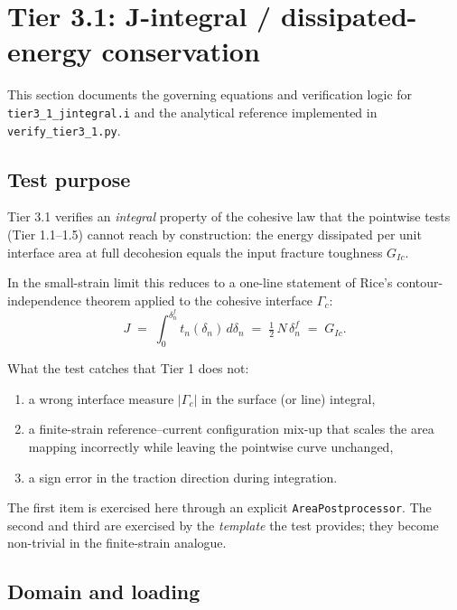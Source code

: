 \section{Tier 3.1: J-integral / dissipated-energy conservation}
\label{sec:tier3_1}

This section documents the governing equations and verification logic for
\texttt{tier3\_1\_jintegral.i} and the analytical reference implemented in
\texttt{verify\_tier3\_1.py}.

\subsection{Test purpose}

Tier 3.1 verifies an \emph{integral} property of the cohesive law that the
pointwise tests (Tier 1.1--1.5) cannot reach by construction:
the energy dissipated per unit interface area at full decohesion equals
the input fracture toughness $G_{Ic}$.

In the small-strain limit this reduces to a one-line statement of Rice's
contour-independence theorem applied to the cohesive interface
$\Gamma_c$:
\begin{equation}
J \;=\;
\int_{0}^{\delta_n^{f}} t_n(\delta_n)\,d\delta_n
\;=\; \tfrac{1}{2}\,N\,\delta_n^{f}
\;=\; G_{Ic}.
\label{eq:Jintegral}
\end{equation}

What the test catches that Tier 1 does not:
\begin{enumerate}
\item a wrong interface measure $|\Gamma_c|$ in the surface (or line)
      integral,
\item a finite-strain reference--current configuration mix-up that scales
      the area mapping incorrectly while leaving the pointwise curve
      unchanged,
\item a sign error in the traction direction during integration.
\end{enumerate}
The first item is exercised here through an explicit \texttt{AreaPostprocessor}.
The second and third are exercised by the \emph{template} the test
provides; they become non-trivial in the finite-strain analogue.

\subsection{Domain and loading}

